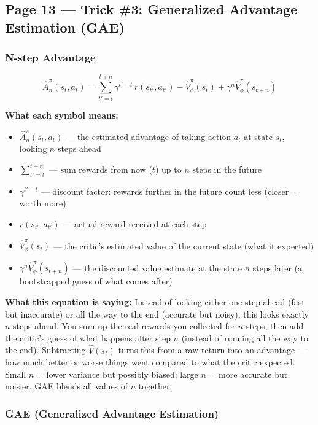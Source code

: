 \subsection*{Page 13 --- Trick \#3: Generalized Advantage Estimation (GAE)}

\subsubsection*{N-step Advantage}

\[
\hat{A}^\pi_n(s_t, a_t) = \sum_{t'=t}^{t+n} \gamma^{t'-t}\, r(s_{t'}, a_{t'}) - \hat{V}^\pi_\phi(s_t) + \gamma^n \hat{V}^\pi_\phi(s_{t+n})
\]

\textbf{What each symbol means:}
\begin{itemize}
    \item $\hat{A}^\pi_n(s_t, a_t)$ --- the estimated advantage of taking action $a_t$ at state $s_t$, looking $n$ steps ahead
    \item $\sum_{t'=t}^{t+n}$ --- sum rewards from now ($t$) up to $n$ steps in the future
    \item $\gamma^{t'-t}$ --- discount factor: rewards further in the future count less (closer = worth more)
    \item $r(s_{t'}, a_{t'})$ --- actual reward received at each step
    \item $\hat{V}^\pi_\phi(s_t)$ --- the critic's estimated value of the current state (what it expected)
    \item $\gamma^n \hat{V}^\pi_\phi(s_{t+n})$ --- the discounted value estimate at the state $n$ steps later (a bootstrapped guess of what comes after)
\end{itemize}

\textbf{What this equation is saying:}
Instead of looking either one step ahead (fast but inaccurate) or all the way to the end (accurate but noisy), this looks exactly $n$ steps ahead. You sum up the real rewards you collected for $n$ steps, then add the critic's guess of what happens after step $n$ (instead of running all the way to the end). Subtracting $\hat{V}(s_t)$ turns this from a raw return into an advantage --- how much better or worse things went compared to what the critic expected. Small $n$ = lower variance but possibly biased; large $n$ = more accurate but noisier. GAE blends all values of $n$ together.

\subsubsection*{GAE (Generalized Advantage Estimation)}

